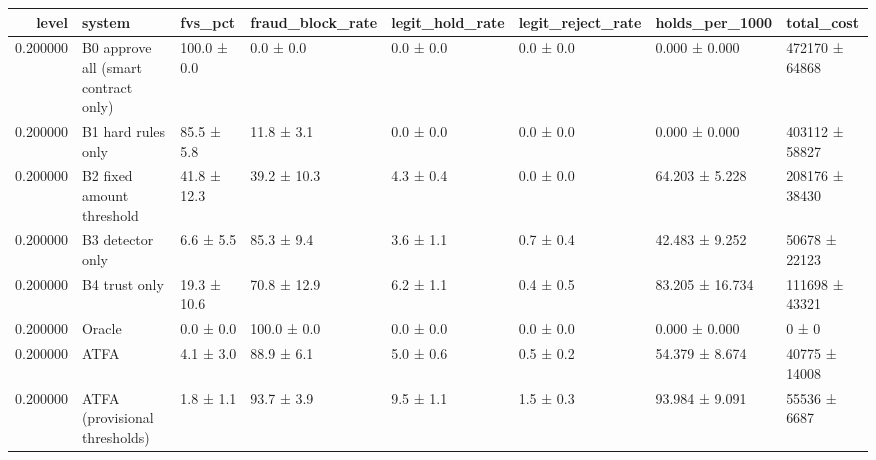 \begin{tabular}{rlllllll}
\toprule
level & system & fvs\_pct & fraud\_block\_rate & legit\_hold\_rate & legit\_reject\_rate & holds\_per\_1000 & total\_cost \\
\midrule
0.200000 & B0 approve all (smart contract only) & 100.0 ± 0.0 & 0.0 ± 0.0 & 0.0 ± 0.0 & 0.0 ± 0.0 & 0.000 ± 0.000 & 472170 ± 64868 \\
0.200000 & B1 hard rules only & 85.5 ± 5.8 & 11.8 ± 3.1 & 0.0 ± 0.0 & 0.0 ± 0.0 & 0.000 ± 0.000 & 403112 ± 58827 \\
0.200000 & B2 fixed amount threshold & 41.8 ± 12.3 & 39.2 ± 10.3 & 4.3 ± 0.4 & 0.0 ± 0.0 & 64.203 ± 5.228 & 208176 ± 38430 \\
0.200000 & B3 detector only & 6.6 ± 5.5 & 85.3 ± 9.4 & 3.6 ± 1.1 & 0.7 ± 0.4 & 42.483 ± 9.252 & 50678 ± 22123 \\
0.200000 & B4 trust only & 19.3 ± 10.6 & 70.8 ± 12.9 & 6.2 ± 1.1 & 0.4 ± 0.5 & 83.205 ± 16.734 & 111698 ± 43321 \\
0.200000 & Oracle & 0.0 ± 0.0 & 100.0 ± 0.0 & 0.0 ± 0.0 & 0.0 ± 0.0 & 0.000 ± 0.000 & 0 ± 0 \\
0.200000 & ATFA & 4.1 ± 3.0 & 88.9 ± 6.1 & 5.0 ± 0.6 & 0.5 ± 0.2 & 54.379 ± 8.674 & 40775 ± 14008 \\
0.200000 & ATFA (provisional thresholds) & 1.8 ± 1.1 & 93.7 ± 3.9 & 9.5 ± 1.1 & 1.5 ± 0.3 & 93.984 ± 9.091 & 55536 ± 6687 \\
\bottomrule
\end{tabular}

